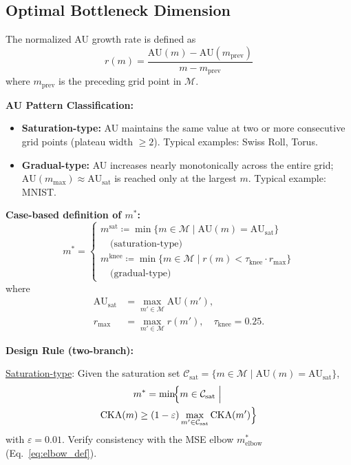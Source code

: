 \documentclass[lettersize,journal]{IEEEtran}
\newcommand{\AUsat}{\mathrm{AU}_{\mathrm{sat}}}
\begin{document}
\subsection{Optimal Bottleneck Dimension}

The normalized AU growth rate is defined as
\begin{equation}
  r(m) = \frac{\mathrm{AU}(m) - \mathrm{AU}(m_\mathrm{prev})}{m - m_\mathrm{prev}}
  \label{eq:au_rate}
\end{equation}
where $m_\mathrm{prev}$ is the preceding grid point in $\mathcal{M}$.

\textbf{AU Pattern Classification:}
\begin{itemize}
  \item \textbf{Saturation-type:} AU maintains the same value at two or more consecutive grid points (plateau width $\geq 2$). Typical examples: Swiss Roll, Torus.
  \item \textbf{Gradual-type:} AU increases nearly monotonically across the entire grid; $\mathrm{AU}(m_{\max}) \approx \AUsat$ is reached only at the largest $m$. Typical example: MNIST.
\end{itemize}

\textbf{Case-based definition of $m^*$:}
\begin{equation}
  m^* =
  \begin{cases}
    m^\mathrm{sat} \coloneqq \min\{m \in \mathcal{M} \mid \mathrm{AU}(m) = \AUsat\} \\
      \quad\text{(saturation-type)} \\[4pt]
    m^\mathrm{knee} \coloneqq \min\{m \in \mathcal{M} \mid r(m) < \tau_\mathrm{knee} \cdot r_\mathrm{max}\} \\
      \quad\text{(gradual-type)}
  \end{cases}
  \label{eq:dzopt}
\end{equation}
where
\begin{align}
  \AUsat &= \max_{m' \in \mathcal{M}} \mathrm{AU}(m'), \label{eq:dzopt_sat} \\
  r_\mathrm{max} &= \max_{m' \in \mathcal{M}} r(m'), \quad \tau_\mathrm{knee} = 0.25. \label{eq:dzopt_knee}
\end{align}

\textbf{Design Rule (two-branch):}

\noindent\underline{Saturation-type}: Given the saturation set $\mathcal{C}_\mathrm{sat} = \{m \in \mathcal{M} \mid \mathrm{AU}(m) = \AUsat\}$,
\begin{multline}
  m^* = \min\!\Bigl\{m \in \mathcal{C}_\mathrm{sat} \;\Big|\; \\
  \mathrm{CKA}(m) \geq (1-\varepsilon)\max_{m'\in\mathcal{C}_\mathrm{sat}}\mathrm{CKA}(m')
  \Bigr\}
  \label{eq:dzopt_cka}
\end{multline}
with $\varepsilon = 0.01$. Verify consistency with the MSE elbow $m^*_\mathrm{elbow}$ (Eq.~\eqref{eq:elbow_def}).
\end{document}

